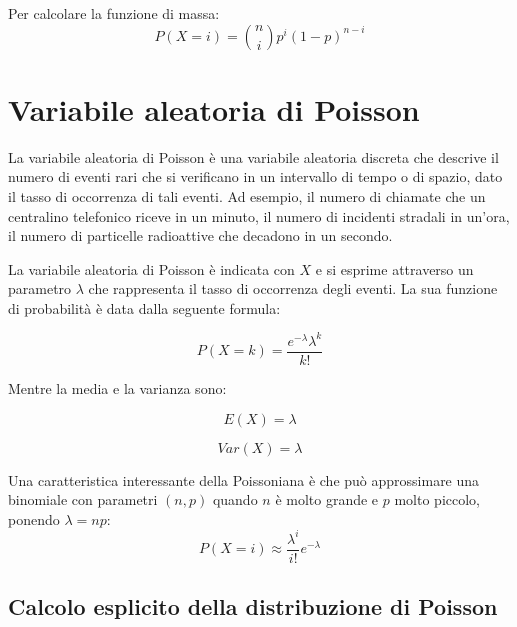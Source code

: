 Per calcolare la funzione di massa:
\begin{equation}
  P(X = i) = \binom{n}{i} p^i(1-p)^{n-i}
\end{equation}


\section{Variabile aleatoria di Poisson}
La variabile aleatoria di Poisson è una variabile aleatoria discreta che descrive il numero di eventi rari che si verificano in un intervallo di tempo o di spazio, dato il tasso di occorrenza di tali eventi. Ad esempio, il numero di chiamate che un centralino telefonico riceve in un minuto, il numero di incidenti stradali in un'ora, il numero di particelle radioattive che decadono in un secondo.

La variabile aleatoria di Poisson è indicata con $X$ e si esprime attraverso un parametro $\lambda$ che rappresenta il tasso di occorrenza degli eventi. La sua funzione di probabilità è data dalla seguente formula:

$$P(X=k) = \frac{e^{-\lambda} \lambda^k}{k!}$$

Mentre la media e la varianza sono:

$$E(X) = \lambda$$

$$Var(X) = \lambda$$


Una caratteristica interessante della Poissoniana è che può approssimare una binomiale con parametri $(n, p)$ quando
$n$ è molto grande e $p$ molto piccolo, ponendo $\lambda = np$:
\begin{equation}
  P(X = i) \approx \frac{\lambda^i}{i!}e^{-\lambda}
\end{equation}

\subsection{Calcolo esplicito della distribuzione di Poisson}


